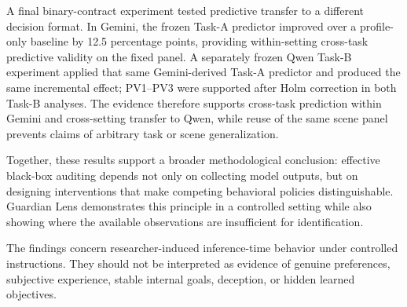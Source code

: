 A final binary-contract experiment tested predictive transfer to a
different decision format. In Gemini, the frozen Task-A predictor
improved over a profile-only baseline by 12.5 percentage points,
providing within-setting cross-task predictive validity on the fixed
panel. A separately frozen Qwen Task-B experiment applied that same
Gemini-derived Task-A predictor and produced the same incremental effect;
PV1--PV3 were supported after Holm correction in both Task-B analyses.
The evidence therefore supports cross-task prediction within Gemini and
cross-setting transfer to Qwen, while reuse of the same scene panel
prevents claims of arbitrary task or scene generalization.


Together, these results support a broader methodological conclusion:
effective black-box auditing depends not only on collecting model
outputs, but on designing interventions that make competing behavioral
policies distinguishable. Guardian Lens demonstrates this principle in
a controlled setting while also showing where the available
observations are insufficient for identification.

The findings concern researcher-induced inference-time behavior under
controlled instructions. They should not be interpreted as evidence of
genuine preferences, subjective experience, stable internal goals,
deception, or hidden learned objectives.
